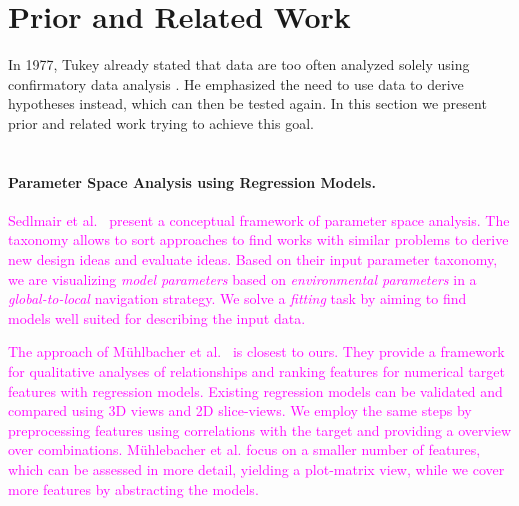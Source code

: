 \documentclass[journal]{style/vgtc} 			          %
\newcommand{\magenta}[1]{\textcolor{magenta}{#1}}
\begin{document}
\section{Prior and Related Work}
In 1977, Tukey already stated that data are too often analyzed solely using confirmatory data analysis \cite{Tukey}.
He emphasized the need to use data to derive hypotheses instead, which can then be tested again.
In this section we present prior and related work trying to achieve this goal.
\\\\
\paragraph{Parameter Space Analysis using Regression Models.}
\magenta{
Sedlmair et al.~\cite{Sedlmair} present a conceptual framework of parameter space analysis.
The taxonomy allows to sort approaches to find works with similar problems to derive new design ideas and evaluate ideas.
Based on their input parameter taxonomy, we are visualizing \emph{model parameters} based on \emph{environmental parameters} in a \emph{global-to-local} navigation strategy.
We solve a \emph{fitting} task by aiming to find models well suited for describing the input data.
}

\magenta{
The approach of M\"{u}hlbacher et al.~\cite{Muehlbacher} is closest to ours.
They provide a framework for qualitative analyses of relationships and ranking features for numerical target features with regression models.
Existing regression models can be validated and compared using 3D views and 2D slice-views.
We employ the same steps by preprocessing features using correlations with the target and providing a overview over combinations.
M\"{u}hlebacher et al. focus on a smaller number of features, which can be assessed in more detail, yielding a plot-matrix view, while we cover more features by abstracting the models.
}
\end{document}
